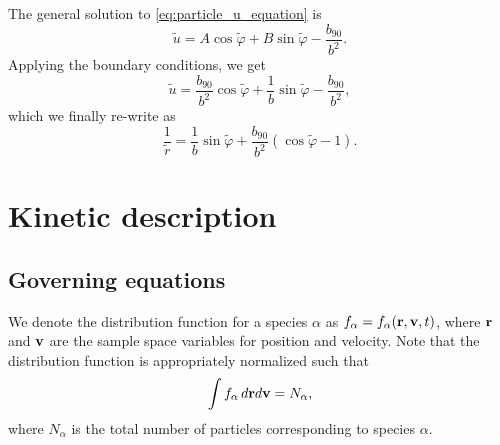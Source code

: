 \documentclass[oneside,a4paper,11pt]{report}
\begin{document}
The general solution to \cref{eq:particle_u_equation} is 
\begin{equation}
    \tilde{u} = A \cos \tilde{\varphi} + B \sin \tilde{\varphi} - \frac{b_{90}}{b^2}.
\end{equation}
Applying the boundary conditions, we get
\begin{equation}
    \tilde{u} = \frac{b_{90}}{b^2} \cos \tilde{\varphi} + \frac{1}{b} \sin \tilde{\varphi} - \frac{b_{90}}{b^2},
\end{equation}
which we finally re-write as
\begin{equation}
    \frac{1}{\tilde{r}} = \frac{1}{b} \sin \tilde{\varphi} + \frac{b_{90}}{b^2} \left ( \cos \tilde{\varphi} - 1 \right ).
\end{equation}

%
%
\part{Kinetic description}
%
%
\chapter{Governing equations}

We denote the distribution function for a species $\alpha$ as $f_\alpha = f_\alpha(\mathbf{r}, \mathbf{v}, t)$, where $\mathbf{r}$ and $\mathbf{v}$ are the sample space variables for position and velocity. Note that the distribution function is appropriately normalized such that
\begin{equation}
\int f_\alpha \, d\mathbf{r} d\mathbf{v} = N_\alpha,
\end{equation}
where $N_\alpha$ is the total number of particles corresponding to species $\alpha$. 
\end{document}
